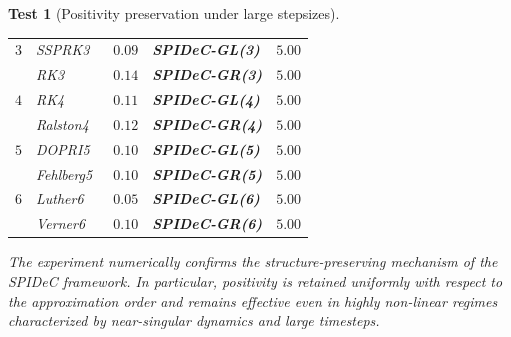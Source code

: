 \documentclass[a4paper,num-refs]{oup-contemporary-spidec}
\newtheorem{testcase}{Test} %
\begin{document}
\begin{testcase}[Positivity preservation under large stepsizes]
\begin{table}[htb]
\begin{tabular}{c | lc | lc}
    \midrule
    
    $3$
    & SSPRK3~\cite[Equation 2.18]{ShuOsher_1988} 
    & $0.09$ 
    & \textbf{SPIDeC-GL(3)} 
    & $\bm{5.00}$ \\
    
    & RK3 ~\cite[Table 1.1]{Hairer_I}    
    & $0.14$ 
    & \textbf{SPIDeC-GR(3)} 
    & $\bm{5.00}$ \\
    
    \midrule
    
    $4$
    & RK4~\cite[Table 2.1]{Hairer_I}           
    & $0.11$ 
    & \textbf{SPIDeC-GL(4)} 
    & $\bm{5.00}$ \\
    
    & Ralston4~\cite[Equations (5.11)-(5.12)]{Ralston_1962}  
    & $0.12$ 
    & \textbf{SPIDeC-GR(4)} 
    & $\bm{5.00}$ \\
    
    \midrule
    
    $5$
    & DOPRI5~\cite[Table 2]{DormandPrince_1980}  
    & $0.10$ 
    & \textbf{SPIDeC-GL(5)} 
    & $\bm{5.00}$ \\
    
    & Fehlberg5~\cite[Table III]{Fehlberg_1969}    
    & $0.10$ 
    & \textbf{SPIDeC-GR(5)} 
    & $\bm{5.00}$ \\
    
    \midrule
    
    $6$
    & Luther6~\cite[Equation (3)]{Luther_1968}   
    & $0.05$ 
    & \textbf{SPIDeC-GL(6)} 
    & $\bm{5.00}$ \\
    
    & Verner6~\cite[Table 5.4]{Hairer_I}   
    & $0.10$ 
    & \textbf{SPIDeC-GR(6)} 
    & $\bm{5.00}$ \\
    
    \bottomrule
    \end{tabular}
\end{table}

The experiment numerically confirms the structure-preserving 
mechanism of the SPIDeC framework.
In particular, positivity is retained uniformly with respect to the 
approximation order and remains effective even in highly non-linear 
regimes characterized by near-singular dynamics and large timesteps.

\end{testcase}
\end{document}
